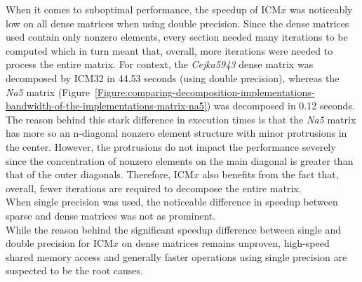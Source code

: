 When it comes to suboptimal performance, the speedup of ICM$ x $ was noticeably low on all dense matrices when using double precision. Since the dense matrices used contain only nonzero elements, every section needed many iterations to be computed which in turn meant that, overall, more iterations were needed to process the entire matrix. For context, the \textit{Cejka5943} dense matrix was decomposed by ICM32 in 44.53 seconds (using double precision), whereas the \textit{Na5} matrix (Figure~\ref{Figure:comparing-decomposition-implementations-bandwidth-of-the-implementations-matrix-na5}) was decomposed in 0.12 seconds. \\
The reason behind this stark difference in execution times is that the \textit{Na5} matrix has more so an n-diagonal nonzero element structure with minor protrusions in the center. However, the protrusions do not impact the performance severely since the concentration of nonzero elements on the main diagonal is greater than that of the outer diagonals. Therefore, ICM$ x $ also benefits from the fact that, overall, fewer iterations are required to decompose the entire matrix. \\
When single precision was used, the noticeable difference in speedup between sparse and dense matrices was not as prominent. \\
While the reason behind the significant speedup difference between single and double precision for ICM$ x $ on dense matrices remains unproven, high-speed shared memory access and generally faster operations using single precision are suspected to be the root causes.

